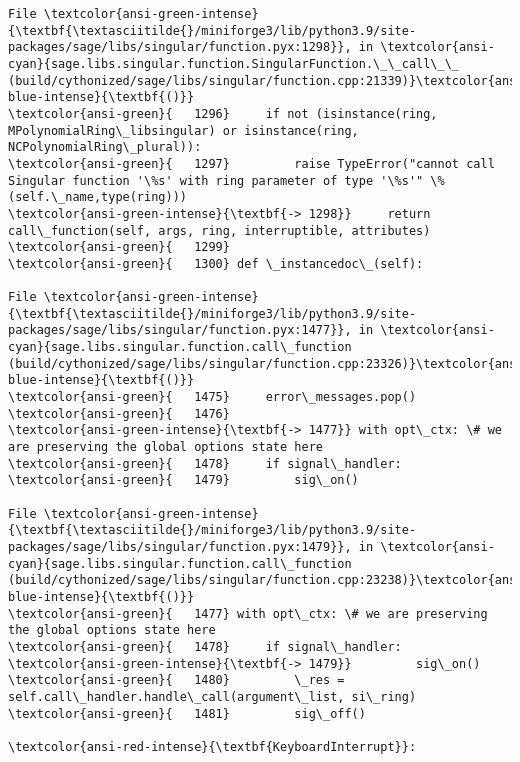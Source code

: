 \documentclass[11pt]{article}
\begin{document}
\begin{Verbatim}[commandchars=\\\{\}, frame=single, framerule=2mm, rulecolor=\color{outerrorbackground}]
File \textcolor{ansi-green-intense}{\textbf{\textasciitilde{}/miniforge3/lib/python3.9/site-packages/sage/libs/singular/function.pyx:1298}}, in \textcolor{ansi-cyan}{sage.libs.singular.function.SingularFunction.\_\_call\_\_ (build/cythonized/sage/libs/singular/function.cpp:21339)}\textcolor{ansi-blue-intense}{\textbf{()}}
\textcolor{ansi-green}{   1296}     if not (isinstance(ring, MPolynomialRing\_libsingular) or isinstance(ring, NCPolynomialRing\_plural)):
\textcolor{ansi-green}{   1297}         raise TypeError("cannot call Singular function '\%s' with ring parameter of type '\%s'" \% (self.\_name,type(ring)))
\textcolor{ansi-green-intense}{\textbf{-> 1298}}     return call\_function(self, args, ring, interruptible, attributes)
\textcolor{ansi-green}{   1299} 
\textcolor{ansi-green}{   1300} def \_instancedoc\_(self):

File \textcolor{ansi-green-intense}{\textbf{\textasciitilde{}/miniforge3/lib/python3.9/site-packages/sage/libs/singular/function.pyx:1477}}, in \textcolor{ansi-cyan}{sage.libs.singular.function.call\_function (build/cythonized/sage/libs/singular/function.cpp:23326)}\textcolor{ansi-blue-intense}{\textbf{()}}
\textcolor{ansi-green}{   1475}     error\_messages.pop()
\textcolor{ansi-green}{   1476} 
\textcolor{ansi-green-intense}{\textbf{-> 1477}} with opt\_ctx: \# we are preserving the global options state here
\textcolor{ansi-green}{   1478}     if signal\_handler:
\textcolor{ansi-green}{   1479}         sig\_on()

File \textcolor{ansi-green-intense}{\textbf{\textasciitilde{}/miniforge3/lib/python3.9/site-packages/sage/libs/singular/function.pyx:1479}}, in \textcolor{ansi-cyan}{sage.libs.singular.function.call\_function (build/cythonized/sage/libs/singular/function.cpp:23238)}\textcolor{ansi-blue-intense}{\textbf{()}}
\textcolor{ansi-green}{   1477} with opt\_ctx: \# we are preserving the global options state here
\textcolor{ansi-green}{   1478}     if signal\_handler:
\textcolor{ansi-green-intense}{\textbf{-> 1479}}         sig\_on()
\textcolor{ansi-green}{   1480}         \_res = self.call\_handler.handle\_call(argument\_list, si\_ring)
\textcolor{ansi-green}{   1481}         sig\_off()

\textcolor{ansi-red-intense}{\textbf{KeyboardInterrupt}}: 
    \end{Verbatim}
\end{document}

